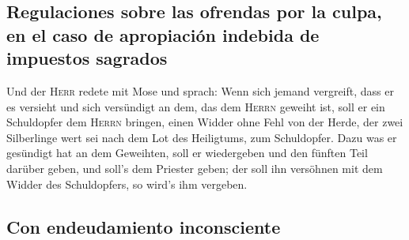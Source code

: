 \hypertarget{regulaciones-sobre-las-ofrendas-por-la-culpa-en-el-caso-de-apropiaciuxf3n-indebida-de-impuestos-sagrados}{%
\subsection{Regulaciones sobre las ofrendas por la culpa, en el caso de
apropiación indebida de impuestos
sagrados}\label{regulaciones-sobre-las-ofrendas-por-la-culpa-en-el-caso-de-apropiaciuxf3n-indebida-de-impuestos-sagrados}}

 Und der \textsc{Herr} redete mit Mose und sprach:
 Wenn sich jemand vergreift, dass er es versieht und sich
versündigt an dem, das dem \textsc{Herrn} geweiht ist, soll er ein
Schuldopfer dem \textsc{Herrn} bringen, einen Widder ohne Fehl von der
Herde, der zwei Silberlinge wert sei nach dem Lot des Heiligtums, zum
Schuldopfer.  Dazu was er gesündigt hat an dem Geweihten,
soll er wiedergeben und den fünften Teil darüber geben, und soll's dem
Priester geben; der soll ihn versöhnen mit dem Widder des Schuldopfers,
so wird's ihm vergeben.

\hypertarget{con-endeudamiento-inconsciente}{%
\subsection{Con endeudamiento
inconsciente}\label{con-endeudamiento-inconsciente}}

